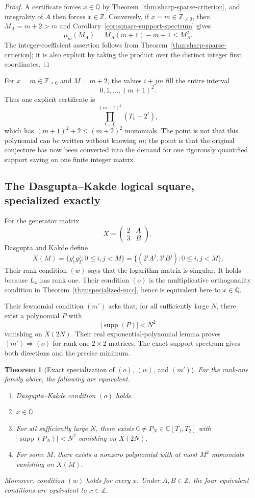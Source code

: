 \documentclass[11pt,oneside]{article}
\newtheorem{theorem}{Theorem}[section]
\theoremstyle{definition}
\theoremstyle{remark}
\newcommand{\Z}{\mathbb Z}
\newcommand{\Q}{\mathbb Q}
\newcommand{\C}{\mathbb C}
\newcommand{\supp}{\operatorname{supp}}
\begin{document}
\begin{proof}
A certificate forces $x\in\Q$ by Theorem~\ref{thm:sharp-sparse-criterion}, and integrality of
$A$ then forces $x\in\Z$.  Conversely, if $x=m\in\Z_{\ge0}$, then $M_A=m+2>m$ and
Corollary~\ref{cor:square-support-spectrum} gives
\[
  \mu_m(M_A)=M_A(m+1)-m+1\le M_A^2.
\]
The integer-coefficient assertion follows from Theorem~\ref{thm:sharp-sparse-criterion}; it
is also explicit by taking the product over the distinct integer first coordinates.
\end{proof}

For $x=m\in\Z_{\ge0}$ and $M=m+2$, the values $i+jm$ fill the entire interval
\[
  0,1,\dots,(m+1)^2.
\]
Thus one explicit certificate is
\[
  \prod_{t=0}^{(m+1)^2}(T_1-2^t),
\]
which has $(m+1)^2+2\le(m+2)^2$ monomials.  The point is not that this polynomial can be
written without knowing $m$; the point is that the original conjecture has now been converted
into the demand for one rigorously quantified support saving on one finite integer matrix.

\subsection{The Dasgupta--Kakde logical square, specialized exactly}
\label{sec:sparse-dk}

For the generator matrix
\[
  X=\begin{pmatrix}2&A\\3&B\end{pmatrix},
\]
Dasgupta and Kakde define
\[
  X(M)=\{g_1^ig_2^j:0\le i,j<M\}
      =\{(2^iA^j,3^iB^j):0\le i,j<M\}.
\]
Their rank condition $(w)$ says that the logarithm matrix is singular.  It holds because
$L_x$ has rank one.  Their condition $(o)$ is the multiplicative orthogonality condition in
Theorem~\ref{thm:specialized-mcc}, hence is equivalent here to $x\in\Q$.

Their fewnomial condition $(m')$ asks that, for all sufficiently large $N$, there exist a
polynomial $P$ with
\[
  |\supp(P)|<N^2
\]
vanishing on $X(2N)$.  Their real exponential-polynomial lemma proves
$(m')\Rightarrow(o)$ for rank-one $2\times2$ matrices.  The exact support spectrum gives both
directions and the precise minimum.

\begin{theorem}[Exact specialization of $(o)$, $(w)$, and $(m')$]
\label{thm:dk-specialization}
For the rank-one family above, the following are equivalent.
\begin{enumerate}
\item Dasgupta--Kakde condition $(o)$ holds.
\item $x\in\Q$.
\item For all sufficiently large $N$, there exists
$0\ne P_N\in\C[T_1,T_2]$ with $|\supp(P_N)|<N^2$ vanishing on $X(2N)$.
\item For some $M$, there exists a nonzero polynomial with at most $M^2$ monomials vanishing
on $X(M)$.
\end{enumerate}
Moreover, condition $(w)$ holds for every $x$.  Under $A,B\in\Z$, the four equivalent
conditions are equivalent to $x\in\Z$.
\end{theorem}
\end{document}
